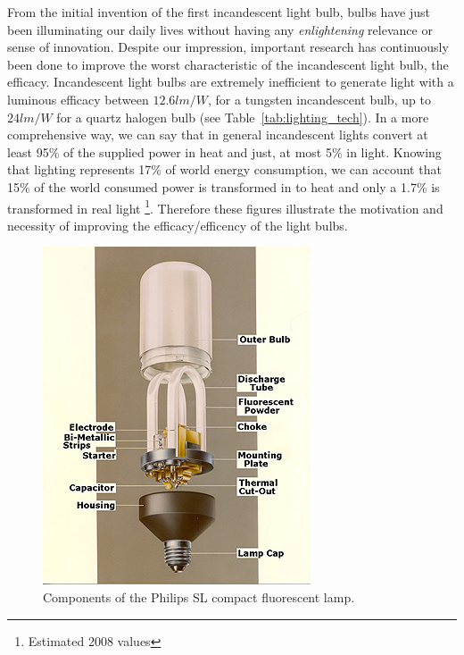 From the initial invention of the first incandescent light bulb,  bulbs have just been illuminating our daily lives without having  any \emph{enlightening} relevance or sense of innovation. Despite our impression,  important research has continuously been done to improve the worst characteristic of the incandescent light bulb, the efficacy. Incandescent light bulbs are extremely inefficient to generate light with a luminous efficacy between $12.6 lm/W$, for a tungsten incandescent bulb, up to $24 lm/W$ for a quartz halogen bulb (see Table~\ref{tab:lighting_tech}). In a more comprehensive way, we can say that in general incandescent lights convert at least 95\% of the supplied power in heat and just, at most 5\% in light. Knowing that lighting represents 17\% of world energy consumption, we can account that 15\% of the world consumed power is transformed in to heat and only a 1.7\% is transformed in real light \footnote{Estimated 2008 values}. Therefore these figures illustrate  the motivation and necessity of improving the efficacy/efficency of the light bulbs.

\begin{figure}[!h]
\centering
\includegraphics{./0_intro/img/phil1b.jpg}
\caption{Components of the Philips SL compact fluorescent lamp. }
\label{fig:philips_sl}
\end{figure}

